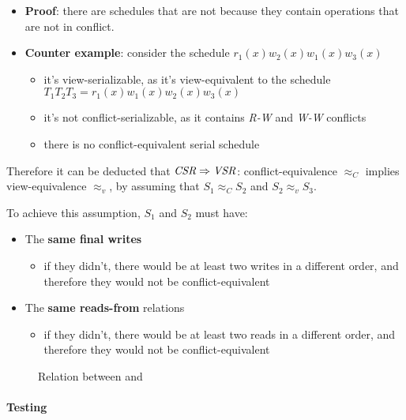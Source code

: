 \documentclass[english]{article}
\begin{document}
\begin{itemize}
  \item \textbf{Proof}: there are \VSR schedules that are not \CSR because they contain operations that are not in conflict.
  \item \textbf{Counter example}: consider the schedule \(r_1(x) w_2(x) w_1(x) w_3(x)\)
        \begin{itemize}
          \item it's view-serializable, as it's view-equivalent to the schedule \(T_1 T_2 T_3 = r_1(x) w_1(x) w_2(x) w_3(x)\)
          \item it's not conflict-serializable, as it contains \textit{R-W} and \textit{W-W} conflicts
          \item there is no conflict-equivalent serial schedule
        \end{itemize}
\end{itemize}

\bigskip
Therefore it can be deducted that \(\textit{CSR} \Rightarrow \textit{VSR}\): conflict-equivalence \(\approx_C\) implies view-equivalence \(\approx_v\), by assuming that \(S_1 \approx_C S_2\) and \(S_2 \approx_v S_3\).

To achieve this assumption, \(S_1\) and \(S_2\) must have:

\begin{itemize}
  \item The \textbf{same final writes}
        \begin{itemize}
          \item if they didn't, there would be at least two writes in a different order, and therefore they would not be conflict-equivalent
        \end{itemize}
  \item The \textbf{same reads-from} relations
        \begin{itemize}
          \item if they didn't, there would be at least two reads in a different order, and therefore they would not be conflict-equivalent
        \end{itemize}
\end{itemize}

\begin{figure}[htbp]
  \bigskip
  \centering
  \caption{Relation between \VSR and \CSR}
  \label{fig:relation-between-vsr-and-csr}
  \bigskip
\end{figure}

\paragraph{Testing \CSR}
\end{document}
